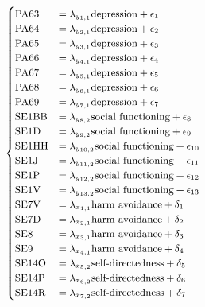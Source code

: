 \documentclass[11pt]{article}
\begin{document}
\begin{equation}
  \small
  \label{eq:measurement_model}
  \begin{cases}
    \textrm{PA63}  & = \lambda_{y_{1,1}}  \textrm{depression}         + \epsilon_1  \\
    \textrm{PA64}  & = \lambda_{y_{2,1}}  \textrm{depression}         + \epsilon_2  \\
    \textrm{PA65}  & = \lambda_{y_{3,1}}  \textrm{depression}         + \epsilon_3  \\
    \textrm{PA66}  & = \lambda_{y_{4,1}}  \textrm{depression}         + \epsilon_4  \\
    \textrm{PA67}  & = \lambda_{y_{5,1}}  \textrm{depression}         + \epsilon_5  \\
    \textrm{PA68}  & = \lambda_{y_{6,1}}  \textrm{depression}         + \epsilon_6  \\
    \textrm{PA69}  & = \lambda_{y_{7,1}}  \textrm{depression}         + \epsilon_7  \\
    \textrm{SE1BB} & = \lambda_{y_{8,2}}  \textrm{social functioning} + \epsilon_8  \\
    \textrm{SE1D}  & = \lambda_{y_{9,2}}  \textrm{social functioning} + \epsilon_9  \\
    \textrm{SE1HH} & = \lambda_{y_{10,2}} \textrm{social functioning} + \epsilon_{10} \\
    \textrm{SE1J}  & = \lambda_{y_{11,2}} \textrm{social functioning} + \epsilon_{11} \\
    \textrm{SE1P}  & = \lambda_{y_{12,2}} \textrm{social functioning} + \epsilon_{12} \\
    \textrm{SE1V}  & = \lambda_{y_{13,2}} \textrm{social functioning} + \epsilon_{13} \\
    \textrm{SE7V}  & = \lambda_{x_{1,1}} \textrm{harm avoidance}     + \delta_1 \\
    \textrm{SE7D}  & = \lambda_{x_{2,1}} \textrm{harm avoidance}     + \delta_2 \\
    \textrm{SE8}   & = \lambda_{x_{3,1}} \textrm{harm avoidance}     + \delta_3 \\
    \textrm{SE9}   & = \lambda_{x_{4,1}} \textrm{harm avoidance}     + \delta_4 \\
    \textrm{SE14O} & = \lambda_{x_{5,2}} \textrm{self-directedness}  + \delta_5 \\
    \textrm{SE14P} & = \lambda_{x_{6,2}} \textrm{self-directedness}  + \delta_6 \\
    \textrm{SE14R} & = \lambda_{x_{7,2}} \textrm{self-directedness}  + \delta_7 \\

\end{cases}
\end{equation}
\end{document}
